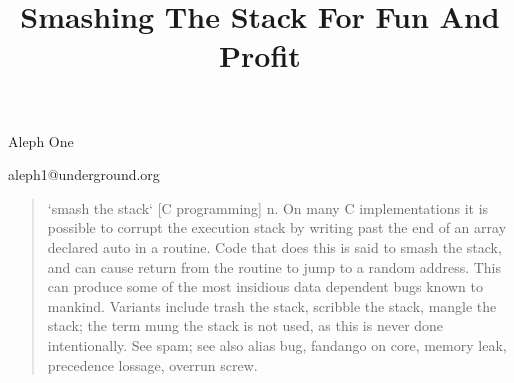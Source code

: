 \documentclass[10pt]{article}
\title{Smashing The Stack For Fun And Profit}
\begin{document}
\maketitle

%

\newpage
\tableofcontents
\newpage

\begin{CJK}{UTF8}{bsmi} %
\begin{comment}
.oO Phrack 49 Oo.

Volume Seven, Issue Forty Nine File 14 of 16

BugTraq, r00t, and Underground.Org

 bring you

\end{comment}

\begin{center}
Aleph One

aleph1@underground.org
\end{center}
\begin{quote}

`smash the stack` [C programming] n. On many C implementations it is possible to corrupt the 
execution stack by writing past the end of an array declared auto in a routine. Code that does this is 
said to smash the stack, and can cause return from the routine to jump to a random address. This 
can produce some of the most insidious data dependent bugs known to mankind. Variants include 
trash the stack, scribble the stack, mangle the stack; the term mung the stack is not used, as this is 
never done intentionally. See spam; see also alias bug, fandango on core,  memory leak, precedence 
lossage, overrun screw.
\end{quote}


\end{CJK}
\end{document}
